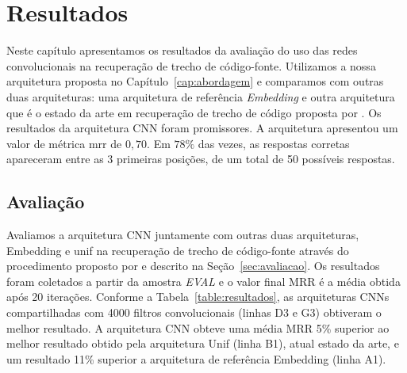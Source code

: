 \chapter{Resultados}
\label{cap:resultados}

Neste capítulo apresentamos os resultados da avaliação do uso das redes convolucionais na recuperação de trecho de código-fonte. Utilizamos a nossa arquitetura proposta no Capítulo~\ref{cap:abordagem} e comparamos com outras duas arquiteturas: uma arquitetura de referência \textit{Embedding} e outra arquitetura que é o estado da arte em recuperação de trecho de código proposta por \cite{cambronero-deep-learning-code-search:2019}. Os resultados da arquitetura CNN foram promissores. A arquitetura apresentou um valor de métrica \acrfull{mrr} de $0,70$. Em $78\%$ das vezes, as respostas corretas apareceram entre as 3 primeiras posições, de um total de 50 possíveis respostas.

\section{Avaliação}
\label{sec:resultados-avaliacao}

Avaliamos a arquitetura CNN juntamente com outras duas arquiteturas, Embedding e \Gls{unif} na recuperação de trecho de código-fonte através do procedimento proposto por \cite{iyer-etal-2016-summarizing} e descrito na Seção~\ref{sec:avaliacao}. Os resultados foram coletados a partir da amostra \emph{EVAL} e o valor final MRR é a média obtida após 20 iterações. Conforme a Tabela~\ref{table:resultados}, as arquiteturas CNNs compartilhadas com 4000 filtros convolucionais (linhas D3 e G3) obtiveram o melhor resultado. A arquitetura CNN obteve uma média MRR 5\% superior ao melhor resultado obtido pela arquitetura Unif (linha B1), atual estado da arte, e um resultado 11\% superior a arquitetura de referência Embedding (linha A1). 


